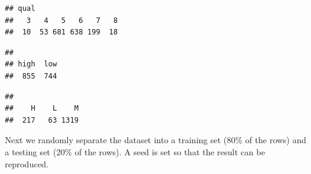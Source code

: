 \documentclass[
]{book}
\newenvironment{Shaded}{\begin{snugshade}}{\end{snugshade}}
\newcommand{\CommentTok}[1]{\textcolor[rgb]{0.56,0.35,0.01}{\textit{#1}}}
\newcommand{\DecValTok}[1]{\textcolor[rgb]{0.00,0.00,0.81}{#1}}
\newcommand{\FunctionTok}[1]{\textcolor[rgb]{0.13,0.29,0.53}{\textbf{#1}}}
\newcommand{\NormalTok}[1]{#1}
\newcommand{\OtherTok}[1]{\textcolor[rgb]{0.56,0.35,0.01}{#1}}
\newcommand{\SpecialCharTok}[1]{\textcolor[rgb]{0.81,0.36,0.00}{\textbf{#1}}}
\newcommand{\StringTok}[1]{\textcolor[rgb]{0.31,0.60,0.02}{#1}}
\begin{document}
\begin{Shaded}
\end{Shaded}

\begin{verbatim}
## qual
##   3   4   5   6   7   8 
##  10  53 681 638 199  18
\end{verbatim}

\begin{Shaded}
\end{Shaded}

\begin{verbatim}
## 
## high  low 
##  855  744
\end{verbatim}

\begin{Shaded}
\end{Shaded}

\begin{verbatim}
## 
##    H    L    M 
##  217   63 1319
\end{verbatim}

Next we randomly separate the dataset into a training set (80\% of the rows) and a testing set (20\% of the rows). A seed is set so that the result can be reproduced.
\end{document}
